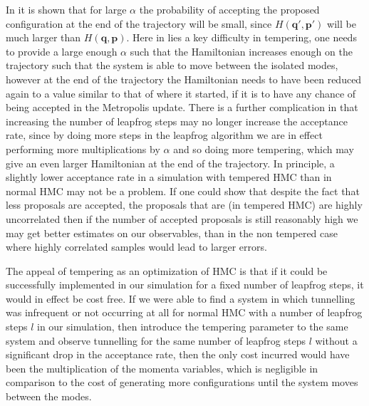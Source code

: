 \documentclass[12pt]{article}
\begin{document}
    In \cite{neal_2011} it is shown that for large $\alpha$ the probability of accepting the proposed configuration at the end of the trajectory will be small, since $H\left(\bm{q}',\bm{p}'\right)$ will be much larger than $H\left(\bm{q},\bm{p}\right)$. Here in lies a key difficulty in tempering, one needs to provide a large enough $\alpha$ such that the Hamiltonian increases enough on the trajectory such that the system is able to move between the isolated modes, however at the end of the trajectory the Hamiltonian needs to have been reduced again to a value similar to that of where it started, if it is to have any chance of being accepted in the Metropolis update. There is a further complication in that increasing the number of leapfrog steps may no longer increase the acceptance rate, since by doing more steps in the leapfrog algorithm we are in effect performing more multiplications by $\alpha$ and so doing more tempering, which may give an even larger Hamiltonian at the end of the trajectory. In principle, a slightly lower acceptance rate in a simulation with tempered HMC than in normal HMC may not be a problem. If one could show that despite the fact that less proposals are accepted, the proposals that are (in tempered HMC) are highly uncorrelated then if the number of accepted proposals is still reasonably high we may get better estimates on our observables, than in the non tempered case where highly correlated samples would lead to larger errors. 

    The appeal of tempering as an optimization of HMC is that if it could be successfully implemented in our simulation for a fixed number of leapfrog steps, it would in effect be cost free. If we were able to find a system in which tunnelling was infrequent or not occurring at all for normal HMC with a number of leapfrog steps $l$ in our simulation, then introduce the tempering parameter to the same system and observe tunnelling for the same number of leapfrog steps $l$ without a significant drop in the acceptance rate, then the only cost incurred would have been the multiplication of the momenta variables, which is negligible in comparison to the cost of generating more configurations until the system moves between the modes.
\end{document}
